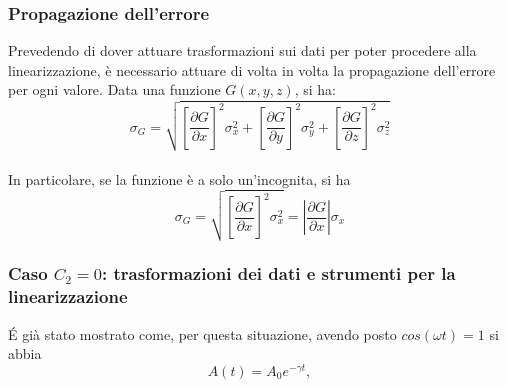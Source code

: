 \documentclass{article}
\begin{document}
\subsubsection{Propagazione dell'errore} 
Prevedendo di dover attuare trasformazioni sui dati per poter procedere alla linearizzazione, è necessario attuare di volta in volta la propagazione dell'errore per ogni valore. Data una funzione $G(x, y, z)$, si ha:
\begin{equation}
    \sigma_G=\sqrt{\left [\frac{\partial G}{\partial x}\right]^2\sigma_x^2+\left[\frac{\partial G}{\partial y}\right]^2\sigma_y^2+\left[\frac{\partial G}{\partial z}\right]^2\sigma_z^2}
\end{equation}\\
In particolare, se la funzione è a solo un'incognita, si ha
\begin{equation}
    \sigma_G=\sqrt{\left [\frac{\partial G}{\partial x}\right]^2\sigma_x^2}=|\frac{\partial G}{\partial x}|\sigma_x
\end{equation}

\subsubsection{Caso $C_2=0$: trasformazioni dei dati e strumenti per la linearizzazione}
\'E già stato mostrato come, per questa situazione, avendo posto $cos(\omega t)=1$ si abbia 
\begin{equation*}
    A(t)=A_0e^{-\gamma t},
\end{equation*}
 
\end{document}
